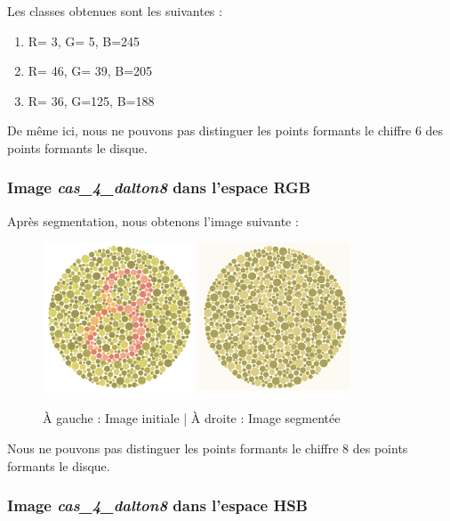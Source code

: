 \documentclass[a4paper]{article}
\begin{document}
Les classes obtenues sont les suivantes :

\begin{enumerate}
  \item R=  3, G=  5, B=245
  \item R= 46, G= 39, B=205
  \item R= 36, G=125, B=188

\end{enumerate}

De même ici, nous ne pouvons pas distinguer les points formants le chiffre 6 des points formants le disque.

\clearpage
\subsubsection{Image {\em cas\_4\_dalton8} dans l'espace RGB}

Après segmentation, nous obtenons l'image suivante :

\begin{figure}[H]
\begin{center}
\includegraphics[width=170px]{../base/cas_4_dalton8.png}
\includegraphics[width=170px]{../resultats/cas_4_dalton8_seg.png}
\end{center}
\caption{À gauche : Image initiale | À droite : Image segmentée}
\end{figure}

Nous ne pouvons pas distinguer les points formants le chiffre 8 des points formants le disque.

\subsubsection{Image {\em cas\_4\_dalton8} dans l'espace HSB}
\end{document}
